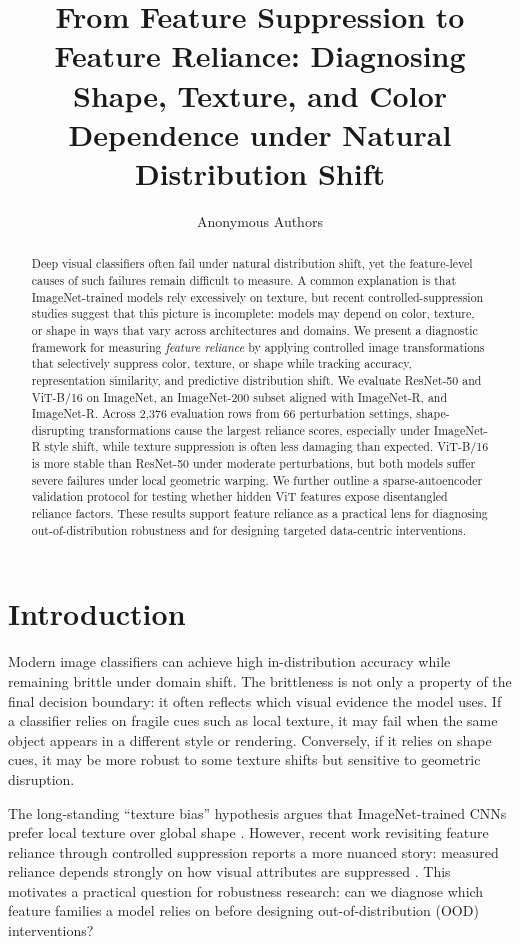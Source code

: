 \documentclass[letterpaper]{article}
\title{From Feature Suppression to Feature Reliance: Diagnosing Shape, Texture, and Color Dependence under Natural Distribution Shift}
\author{
Anonymous Authors
}
\begin{document}
\maketitle

\begin{abstract}
Deep visual classifiers often fail under natural distribution shift, yet the
feature-level causes of such failures remain difficult to measure. A common
explanation is that ImageNet-trained models rely excessively on texture, but
recent controlled-suppression studies suggest that this picture is incomplete:
models may depend on color, texture, or shape in ways that vary across
architectures and domains. We present a diagnostic framework for measuring
\emph{feature reliance} by applying controlled image transformations that
selectively suppress color, texture, or shape while tracking accuracy,
representation similarity, and predictive distribution shift. We evaluate
ResNet-50 and ViT-B/16 on ImageNet, an ImageNet-200 subset aligned with
ImageNet-R, and ImageNet-R. Across 2,376 evaluation rows from 66 perturbation
settings, shape-disrupting transformations cause the largest reliance scores,
especially under ImageNet-R style shift, while texture suppression is often
less damaging than expected. ViT-B/16 is more stable than ResNet-50 under
moderate perturbations, but both models suffer severe failures under local
geometric warping. We further outline a sparse-autoencoder validation protocol
for testing whether hidden ViT features expose disentangled reliance factors.
These results support feature reliance as a practical lens for diagnosing
out-of-distribution robustness and for designing targeted data-centric
interventions.
\end{abstract}

\section{Introduction}

Modern image classifiers can achieve high in-distribution accuracy while
remaining brittle under domain shift. The brittleness is not only a property of
the final decision boundary: it often reflects which visual evidence the model
uses. If a classifier relies on fragile cues such as local texture, it may fail
when the same object appears in a different style or rendering. Conversely, if
it relies on shape cues, it may be more robust to some texture shifts but
sensitive to geometric disruption.

The long-standing ``texture bias'' hypothesis argues that ImageNet-trained CNNs
prefer local texture over global shape \cite{geirhos2019imagenet}. However,
recent work revisiting feature reliance through controlled suppression reports a
more nuanced story: measured reliance depends strongly on how visual attributes
are suppressed \cite{burgert2025feature}. This motivates a practical question
for robustness research: can we diagnose which feature families a model relies
on before designing out-of-distribution (OOD) interventions?
\end{document}
